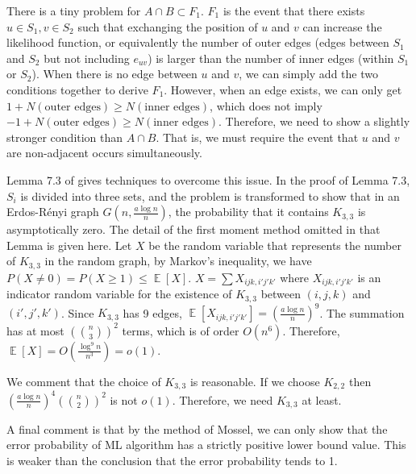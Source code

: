 \documentclass{article}
\DeclareMathOperator{\E}{\mathbb{E}}
\begin{document}
There is a tiny problem for
$A\cap B \subset F_1$. $F_1$ is the event that
there exists $u \in S_1, v \in S_2$ such that exchanging
the position of $u$ and $v$ can increase
the likelihood function, or equivalently
the number of outer edges (edges between $S_1$ and $S_2$ but not including $e_{uv}$)
is larger than the number of inner edges (within $S_1$ or $S_2$).
When there is no edge between $u$ and $v$, we can
simply add the two conditions together to derive
$F_1$. However, when an edge exists, we can
only get $1 + N(\textrm{outer edges}) \geq N(\textrm{inner edges})$,
which does not imply $-1+N(\textrm{outer edges}) \geq N(\textrm{inner edges})$.
Therefore, we need to show a slightly stronger condition
than $A\cap B$. That is, we must require the event that $u$ and $v$
are non-adjacent occurs simultaneously.

Lemma 7.3 of \cite{mossel} gives techniques to overcome this issue.
In the proof of Lemma 7.3, $S_i$ is divided into three sets,
and the problem is transformed to show that in an Erdos-Rényi
graph $G(n, \frac{a\log n}{n})$, the probability that it contains $K_{3,3}$
is asymptotically zero. The detail of the first moment method
omitted in that Lemma is given here. Let $X$ be the random
variable that represents the number of $K_{3,3}$ in the
random graph, by Markov's inequality, we have $P(X\neq 0)
=P(X\geq 1)\leq \E[X]$.
$X = \sum X_{ijk,i'j'k'}$ where $X_{ijk,i'j'k'}$ is an
indicator random variable for the existence of $K_{3,3}
$ between $(i,j,k)$ and $(i',j',k')$. Since $K_{3,3}$
has 9 edges,
$\E[X_{ijk,i'j'k'}] = (\frac{a \log n}{n})^9$. The summation
has at most $(\binom{n}{3})^2$ terms, which is of order $O(n^6)$.
Therefore, $\E[X] = O(\frac{\log^9 n}{n^3}) = o(1)$.

We comment that the choice of $K_{3,3}$ is reasonable.
If we choose $K_{2,2}$ then $(\frac{a \log n}{n})^4 (\binom{n}{2})^2$
is not $o(1)$. Therefore, we need $K_{3,3}$ at least.

A final comment is that by the method of Mossel, we
can only show that the error probability of ML algorithm 
has a strictly positive lower bound value. This is weaker
than the conclusion that the error probability tends to 1.
\end{document}
